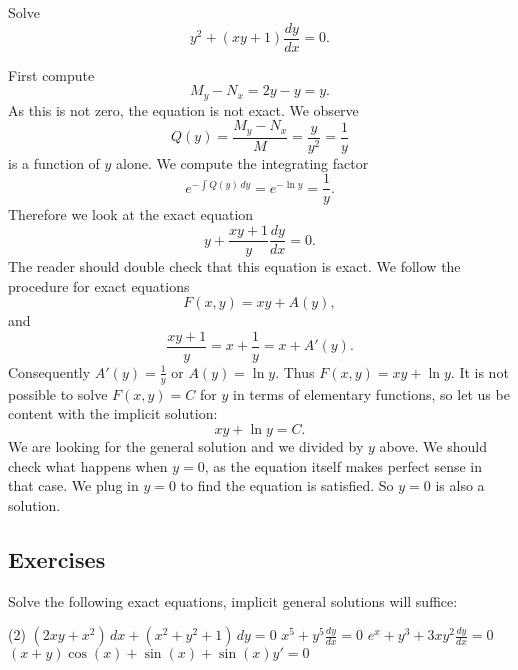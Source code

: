 \begin{example}
Solve
\begin{equation*}
y^2 + (xy+1) \frac{dy}{dx} = 0 .
\end{equation*}

First compute
\begin{equation*}
M_y-N_x = 2y-y = y .
\end{equation*}
As this is not zero, the equation is not exact.  We observe
\begin{equation*}
Q(y) = \frac{M_y-N_x}{M} = \frac{y}{y^2} = \frac{1}{y} 
\end{equation*}
is a function of $y$ alone.    We compute the integrating factor
\begin{equation*}
e^{-\int  Q(y) \, dy}
=
e^{-\ln y} = \frac{1}{y} .
\end{equation*}
Therefore we look at the exact equation
\begin{equation*}
y + \frac{xy+1}{y} \frac{dy}{dx} = 0 .
\end{equation*}
The reader should double check that this equation is exact.
We follow the procedure for exact equations
\begin{equation*}
F(x,y) = xy + A(y) ,
\end{equation*}
and
\begin{equation}
\frac{xy+1}{y} = x+\frac{1}{y} = x+ A'(y) .
\end{equation}
Consequently $A'(y) = \frac{1}{y}$ or $A(y) = \ln y$.  Thus $F(x,y) = xy + \ln y$.
It is not possible to solve $F(x,y)=C$ for $y$
in terms of elementary functions, so 
let us be content with the implicit solution:
\begin{equation*}
xy + \ln y = C .
\end{equation*}
We are looking for the general solution and we divided by
$y$ above.  We should check what happens when $y=0$, as the equation itself
makes perfect sense in that case.  We plug in $y=0$ to find the
equation is satisfied.  So $y=0$ is also a solution.
\end{example}

\subsection{Exercises}

\begin{exercise}
Solve the following exact equations, implicit general solutions
will suffice:
\begin{tasks}(2)
\task
$(2 xy + x^2) \, dx + (x^2+y^2+1) \, dy = 0$
\task
$x^5 + y^5 \frac{dy}{dx} = 0$
\task
$e^x+y^3 + 3xy^2 \frac{dy}{dx} = 0$
\task
$(x+y)\cos(x)+\sin(x) + \sin(x)y' = 0$
\end{tasks}
\end{exercise}

